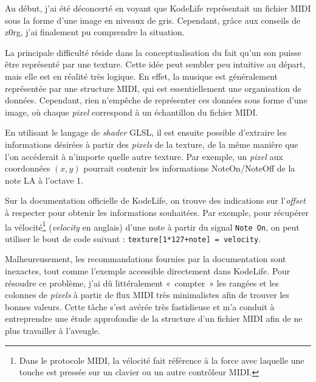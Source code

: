 Au début, j'ai été déconcerté en voyant que KodeLife représentait un fichier MIDI sous la forme d'une image en niveaux de gris. Cependant, grâce aux conseils de z0rg, j'ai finalement pu comprendre la situation.

La principale difficulté réside dans la conceptualisation du fait qu'un son puisse être représenté par une texture. Cette idée peut sembler peu intuitive au départ, mais elle est en réalité très logique. En effet, la musique est généralement représentée par une structure MIDI, qui est essentiellement une organisation de données. Cependant, rien n'empêche de représenter ces données sous forme d'une image, où chaque \textit{pixel} correspond à un échantillon du fichier MIDI. 

En utilisant le langage de \textit{shader} GLSL, il est ensuite possible d'extraire les informations désirées à partir des \textit{pixels} de la texture, de la même manière que l'on accéderait à n'importe quelle autre texture. Par exemple, un \textit{pixel} aux coordonnées $(x, y)$ pourrait contenir les informations NoteOn/NoteOff de la note LA à l'octave 1. 

Sur la documentation officielle de KodeLife, on trouve des indications sur l'\textit{offset} à respecter pour obtenir les informations souhaitées. Par exemple, pour récupérer la vélocité\footnote{Dans le protocole MIDI, la vélocité fait référence à la force avec laquelle une touche est pressée sur un clavier ou un autre contrôleur MIDI.} (\textit{velocity} en anglais) d'une note à partir du signal \lstinline{Note On}, on peut utiliser le bout de code suivant : \lstinline{texture[1*127+note] = velocity}. 

Malheureusement, les recommandations fournies par la documentation sont inexactes, tout comme l'exemple accessible directement dans KodeLife. Pour résoudre ce problème, j'ai dû littéralement «~compter~» les rangées et les colonnes de \textit{pixels} à partir de flux MIDI très minimalistes afin de trouver les bonnes valeurs. Cette tâche s'est avérée très fastidieuse et m'a conduit à entreprendre une étude approfondie de la structure d'un fichier MIDI afin de ne plus travailler à l'aveugle.


